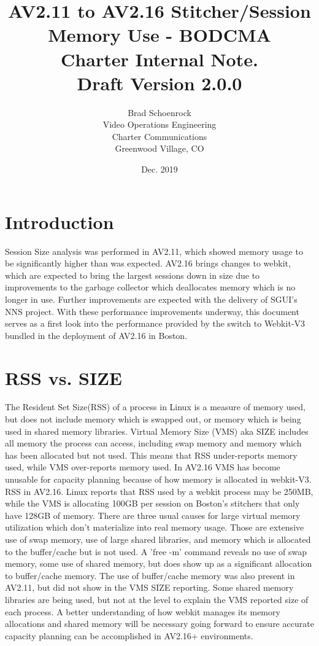\documentclass{article}
\author{Brad Schoenrock\\Video Operations Engineering\\Charter Communications\\Greenwood Village, CO}
\title{AV2.11 to AV2.16 Stitcher/Session Memory Use - BODCMA\\Charter Internal Note.\\Draft Version 2.0.0}
\date{Dec. 2019}
\begin{document}
\maketitle
\newpage

\tableofcontents
\newpage

\section{Introduction}
\label{SECTION-Introduction}

Session Size analysis was performed in AV2.11, which showed memory usage to be significantly higher than was expected. AV2.16 brings changes to webkit, which are expected to bring the largest sessions down in size due to improvements to the garbage collector which deallocates memory which is no longer in use. Further improvements are expected with the delivery of SGUI's NNS project. With these performance improvements underway, this document serves as a first look into the performance provided by the switch to Webkit-V3 bundled in the deployment of AV2.16 in Boston. 

\section{RSS vs. SIZE}
\label{SECTION-RSS}

The Resident Set Size(RSS) of a process in Linux is a measure of memory used, but does not include memory which is swapped out, or memory which is being used in shared memory libraries. Virtual Memory Size (VMS) aka SIZE includes all memory the process can access, including swap memory and memory which has been allocated but not used. This means that RSS under-reports memory used, while VMS over-reports memory used. In AV2.16 VMS has become unusable for capacity planning because of how memory is allocated in webkit-V3. RSS in AV2.16. Linux reports that RSS used by a webkit process may be 250MB, while the VMS is allocating 100GB per session on Boston's stitchers that only have 128GB of memory. There are three usual causes for large virtual memory utilization which don't materialize into real memory usage. Those are extensive use of swap memory, use of large shared libraries, and memory which is allocated to the buffer/cache but is not used. A 'free -m' command reveals no use of swap memory, some use of shared memory, but does show up as a significant allocation to buffer/cache memory. The use of buffer/cache memory was also present in AV2.11, but did not show in the VMS SIZE reporting. Some shared memory libraries are being used, but not at the level to explain the VMS reported size of each process. A better understanding of how webkit manages its memory allocations and shared memory will be necessary going forward to ensure accurate capacity planning can be accomplished in AV2.16+ environments. 
\end{document}
